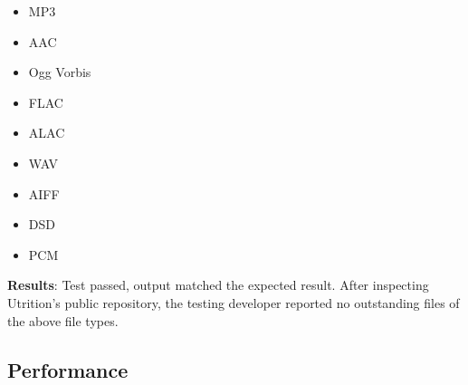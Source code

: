 \documentclass[12pt, titlepage]{article}
\begin{document}
\begin{enumerate}
		\begin{itemize}
			\item MP3
			\item AAC
			\item Ogg Vorbis
			\item FLAC
			\item ALAC
			\item WAV
			\item AIFF
			\item DSD
			\item PCM
		\end{itemize}
	
	\textbf{Results}: Test passed, output matched the expected result. After inspecting Utrition's public repository, the testing developer reported no outstanding files of the above file types.
	
	\end{enumerate}
	
	\subsection{Performance}
	
\end{document}
